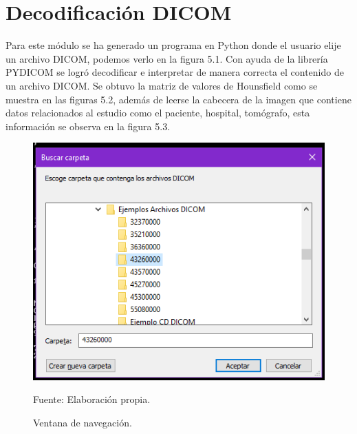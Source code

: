 \documentclass[12pt]{report}
\begin{document}
\section{Decodificación DICOM}
Para este módulo se ha generado un programa en Python donde el usuario elije un archivo DICOM, podemos verlo en la figura 5.1. Con ayuda de la librería PYDICOM se logró decodificar e interpretar de manera correcta el contenido de un archivo DICOM. Se obtuvo la matriz de valores de Hounsfield como se muestra en las figuras 5.2, además de leerse la cabecera de la imagen que contiene datos relacionados al estudio como el paciente, hospital, tomógrafo, esta información se observa en la figura 5.3.

\begin{figure}[H]
\centering
\includegraphics[width = 5 cm, height = 5 cm]{navega}
\caption{Ventana de navegación.}
Fuente: Elaboración propia.
\end{figure}
\end{document}
